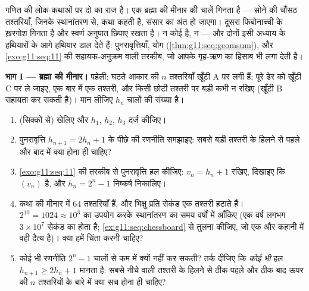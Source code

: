 \begin{problem}
\label{pb:g11:seq:1}
गणित की लोक-कथाओं पर दो  का राज है। एक ब्रह्मा की मीनार की चालें
गिनता है --- सोने की चौंसठ तश्तरियाँ, जिनके स्थानांतरण से, कथा कहती है,
संसार का अंत हो जाएगा। दूसरा फिबोनाच्ची के ख़रगोश गिनता है और स्वर्ण अनुपात
छिपाए रखता है। न कोई  है, न  --- और दोनों इसी अध्याय के
हथियारों के आगे हथियार डाल देते हैं: पुनरावृत्तियाँ,  योग (\cref{thm:g11:seq:geomsum}),
और \cref{exo:g11:seq:11} की सहायक-अनुक्रम वाली तरकीब, जो आपके गृह-ऋण का हिसाब भी लगा देती
है।

\medskip
\noindent\textbf{भाग I --- ब्रह्मा की मीनार।}
पहेली: घटते आकार की $n$ तश्तरियाँ खूँटी A पर लगी हैं; पूरे ढेर को खूँटी C
पर ले जाइए, एक बार में एक तश्तरी, और किसी छोटी तश्तरी पर बड़ी कभी न रखिए
(खूँटी B सहायता कर सकती है)। मान लीजिए $h_n$  चालों की संख्या है।
\begin{enumerate}
  \item (सिक्कों से) खेलिए और $h_1$, $h_2$, $h_3$ दर्ज कीजिए।
  \item पुनरावृत्ति $h_{n+1} = 2h_n + 1$ के पीछे की रणनीति समझाइए: सबसे बड़ी तश्तरी के
        हिलने से पहले और बाद में क्या होना ही चाहिए?
  \item \cref{exo:g11:seq:11} की तरकीब से पुनरावृत्ति हल कीजिए: $v_n = h_n + 1$ रखिए, दिखाइए कि $(v_n)$
         है, और $h_n = 2^n - 1$ निष्कर्ष निकालिए।
  \item कथा की मीनार में $64$ तश्तरियाँ हैं, और भिक्षु प्रति सेकंड एक
        तश्तरी हटाते हैं। $2^{10} = 1024 \approx 10^3$ का उपयोग करके स्थानांतरण का समय वर्षों में
        आँकिए (एक वर्ष लगभग $3 \times 10^7$ सेकंड का होता है; \cref{ex:g11:seq:chessboard} से तुलना कीजिए,
        जो एक और कहानी में वही दैत्य है)। क्या हमें चिंता करनी चाहिए?
  \item कोई भी रणनीति $2^n - 1$ चालों से कम में क्यों नहीं कर सकती? तर्क दीजिए
        कि \emph{कोई भी} हल $h_{n+1} \geq 2 h_n + 1$ मानता है: सबसे नीचे वाली तश्तरी के हिलने
        से ठीक पहले और ठीक बाद ऊपर की $n$ तश्तरियों के बारे में क्या सच
        होना ही चाहिए?
\end{enumerate}


\end{problem}
